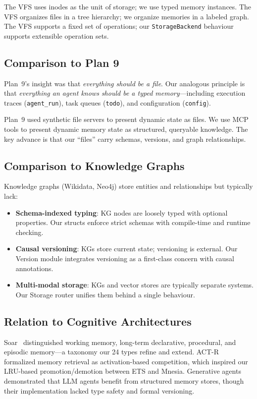 \documentclass[12pt,a4paper]{article}
\theoremstyle{definition}
\begin{document}
The VFS uses inodes as the unit of storage; we use typed memory instances.
The VFS organizes files in a tree hierarchy; we organize memories in a labeled graph.
The VFS supports a fixed set of operations; our \texttt{StorageBackend} behaviour supports extensible operation sets.

\subsection{Comparison to Plan 9}\label{subsec:plan9}

Plan~9's insight was that \emph{everything should be a file}.
Our analogous principle is that \emph{everything an agent knows should be a typed memory}---including execution traces (\texttt{agent\_run}), task queues (\texttt{todo}), and configuration (\texttt{config}).

Plan~9 used synthetic file servers to present dynamic state as files.
We use MCP tools to present dynamic memory state as structured, queryable knowledge.
The key advance is that our ``files'' carry schemas, versions, and graph relationships.

\subsection{Comparison to Knowledge Graphs}\label{subsec:kg-comparison}

Knowledge graphs (Wikidata, Neo4j) store entities and relationships but typically lack:
\begin{itemize}
  \item \textbf{Schema-indexed typing}: KG nodes are loosely typed with optional properties.
  Our structs enforce strict schemas with compile-time and runtime checking.
  \item \textbf{Causal versioning}: KGs store current state; versioning is external.
  Our Version module integrates versioning as a first-class concern with causal annotations.
  \item \textbf{Multi-modal storage}: KGs and vector stores are typically separate systems.
  Our Storage router unifies them behind a single behaviour.
\end{itemize}

\subsection{Relation to Cognitive Architectures}\label{subsec:cognitive}

Soar~\citep{laird2012soar} distinguished working memory, long-term declarative, procedural, and episodic memory---a taxonomy our 24 types refine and extend.
ACT-R~\citep{anderson2004actr} formalized memory retrieval as activation-based competition, which inspired our LRU-based promotion/demotion between ETS and Mnesia.
Generative agents~\citep{park2023generative} demonstrated that LLM agents benefit from structured memory stores, though their implementation lacked type safety and formal versioning.
\end{document}
